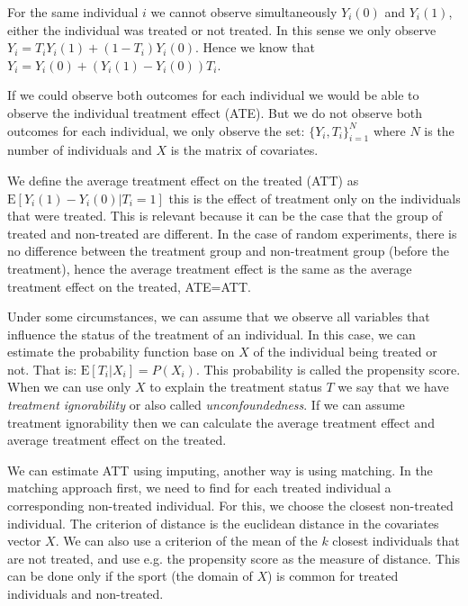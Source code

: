 \documentclass[9pt,a4paper]{article}
\newcommand{\E}{\mathrm{E}}
\begin{document}
For the same individual $i$ we cannot observe simultaneously $Y_i(0)$ and $Y_i(1)$, either the individual was treated or not treated.
In this sense we only observe $Y_i = T_i Y_i(1)  + (1-T_i) Y_i(0) $.
Hence we know that $Y_i = Y_i(0)  + ( Y_i(1) - Y_i(0)  )T_i $.

If we could observe both outcomes for each individual we would be able to observe the individual treatment effect (ATE).
But we do not observe both outcomes for each individual, we only observe the set: $ \{ Y_i, T_i\}^N_{i=1}  $ where $N$ is the number of individuals and $X$ is the matrix of covariates.

We define the average treatment effect on the treated (ATT) as $ \E[ Y_i(1) - Y_i(0) | T_i = 1   ] $ this is the effect of treatment only on the individuals that were treated. This is relevant because it can be the case that the group of treated and non-treated are different.
In the case of random experiments, there is no difference between the treatment group and non-treatment group (before the treatment), hence the average treatment effect is the same as the average treatment effect on the treated, ATE=ATT.

Under some circumstances, we can assume that we observe all variables that influence the status of the treatment of an individual. In this case, we can estimate the probability function base on $X$ of the individual being treated or not. That is: $\E[T_i|X_i] = P(X_i)$. This probability is called the propensity score.
When we can use only $X$ to explain the treatment status $T$ we say that we have \textit{treatment ignorability} or also called \textit{unconfoundedness}. If we can assume treatment ignorability then we can calculate the average treatment effect and average treatment effect on the treated.

We can estimate ATT using imputing, another way is using matching. In the matching approach first, we need to find for each treated individual a corresponding non-treated individual. For this, we choose the closest non-treated individual. The criterion of distance is the euclidean distance in the covariates vector $X$. We can also use a criterion of the mean of the $k$ closest individuals that are not treated, and use e.g. the propensity score as the measure of distance. This can be done only if the sport (the domain of $X$) is common for treated individuals and non-treated.
\end{document}
